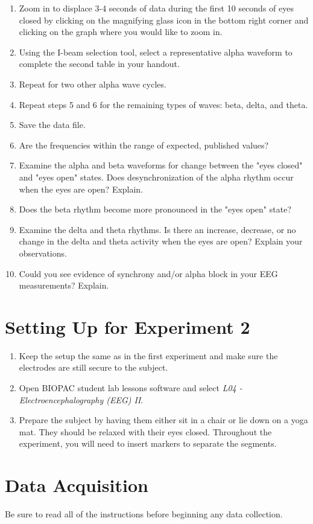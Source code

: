 \documentclass{article}
\begin{document}
\begin{enumerate}
	\item Zoom in to displace 3-4 seconds of data during the first 10 seconds of eyes closed by clicking on the magnifying glass icon in the bottom right corner and clicking on the graph where you would like to zoom in.
	\item Using the I-beam selection tool, select a representative alpha waveform to complete the second table in your handout.
	\item Repeat for two other alpha wave cycles.
	\item Repeat steps 5 and 6 for the remaining types of waves: beta, delta, and theta.
	\item Save the data file.
	\item Are the frequencies within the range of expected, published values?
	\item Examine the alpha and beta waveforms for change between the "eyes closed" and "eyes open" states. Does desynchronization of the alpha rhythm occur when the eyes are open? Explain.
	\item Does the beta rhythm become more pronounced in the "eyes open" state?
	\item Examine the delta and theta rhythms. Is there an increase, decrease, or no change in the delta and theta activity when the eyes are open? Explain your observations.
	\item Could you see evidence of synchrony and/or alpha block in your EEG measurements? Explain.
\end{enumerate}

\section*{Setting Up for Experiment 2}
\begin{enumerate}
	\item Keep the setup the same as in the first experiment and make sure the electrodes are still secure to the subject.
	\item Open BIOPAC student lab lessons software and select \textit{L04 - Electroencephalography (EEG) II}.
	\item Prepare the subject by having them either sit in a chair or lie down on a yoga mat. They should be relaxed with their eyes closed. Throughout the experiment, you will need to insert markers to separate the segments.
\end{enumerate}

\section*{Data Acquisition}
Be sure to read all of the instructions before beginning any data collection.
\end{document}
